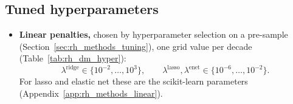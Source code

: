 \subsection{Tuned hyperparameters}
\label{sec:rh_methods_hyper}
\label{app:rh_hyper}
\begin{itemize}
\item \textbf{Linear penalties,} chosen by hyperparameter selection on a pre-sample
  (Section~\ref{sec:rh_methods_tuning}), one grid value per decade
  (Table~\ref{tab:rh_dm_hyper}):
  \[
    \lambda^{\mathrm{ridge}} \in \{10^{-2}, \dots, 10^{3}\}, \qquad
    \lambda^{\mathrm{lasso}}, \lambda^{\mathrm{enet}} \in \{10^{-6}, \dots, 10^{-2}\}.
  \]
  For lasso and elastic net these are the scikit-learn parameters
  (Appendix~\ref{app:rh_methods_linear}).
  \begin{itemize}

\end{itemize}
\end{itemize}
